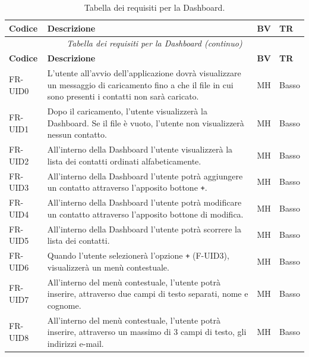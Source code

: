 \documentclass[a4paper,12pt]{article}
\begin{document}
    \begin{longtable}{|l|p{8cm}|l|l|}
        \caption{Tabella dei requisiti per la Dashboard.} \\

        \hline
        \textbf{Codice} & \textbf{Descrizione} & \textbf{BV} & \textbf{TR} \\
        \hline
        \endfirsthead

        \multicolumn{4}{c}{\footnotesize \textit{Tabella dei requisiti per la Dashboard (continuo)}}\\
        \hline
        \textbf{Codice} & \textbf{Descrizione} & \textbf{BV} & \textbf{TR} \\
        \hline
        \endhead

        FR-UID0  & L'utente all'avvio dell'applicazione dovrà visualizzare un messaggio
        di caricamento fino a che il file in cui sono presenti i contatti non sarà caricato. & MH & Basso \\
        \hline
        FR-UID1  & Dopo il caricamento, l'utente visualizzerà la Dashboard. Se il file è vuoto,
        l'utente non visualizzerà nessun contatto. & MH & Basso \\
        \hline
        FR-UID2  & All'interno della Dashboard l'utente visualizzerà la lista dei contatti ordinati alfabeticamente.
        & MH & Basso \\
        \hline
        FR-UID3  & All'interno della Dashboard l'utente potrà aggiungere un contatto
        attraverso l'apposito bottone \texttt{+}. & MH & Basso \\
        \hline
        FR-UID4  & All'interno della Dashboard l'utente potrà modificare un contatto
        attraverso l'apposito bottone di modifica. & MH & Basso \\
        \hline
        FR-UID5  & All'interno della Dashboard l'utente potrà scorrere la lista dei contatti. & MH & Basso \\
        \hline
        FR-UID6  & Quando l'utente selezionerà l'opzione \texttt{+} (F-UID3), visualizzerà un menù contestuale. & MH & Basso \\
        \hline
        FR-UID7  & All'interno del menù contestuale, l'utente potrà inserire, attraverso
        due campi di testo separati, nome e cognome. & MH & Basso \\
        \hline
        FR-UID8  & All'interno del menù contestuale, l'utente potrà inserire,
        attraverso un massimo di 3 campi di testo, gli indirizzi e-mail. & MH & Basso \\

\end{longtable}
\end{document}
